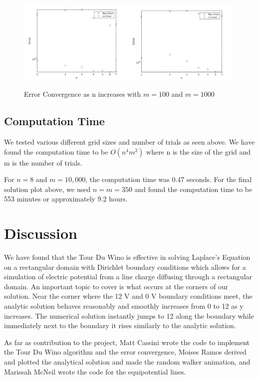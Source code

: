 \documentclass{amsart}
\begin{document}
\begin{figure}[H]
	\caption{Error Convergence as n increases with $m=100$ and $m=1000$}
	\label{gridsizeconv}
	\includegraphics[width=0.48\textwidth]{error_plot_m=100.jpg}
	\includegraphics[width=0.49\textwidth]{error_plot_m=1000.jpg}
\end{figure} 

\subsection{Computation Time}

We tested various different grid sizes and number of trials as seen above. We have found the computation time to be $O(n^4m^2)$ where n is the size of the grid and m is the number of trials.

For $n = 8$ and $m = 10,000$, the computation time was 0.47 seconds. For the final solution plot above, we used $n = m = 350$ and found the computation time to be 553 minutes or approximately 9.2 hours.

\section{Discussion}
We have found that the Tour Du Wino is effective in solving Laplace's Equation on a rectangular domain with Dirichlet boundary conditions which allows for a simulation of electric potential from a line charge diffusing through a rectangular domain. An important topic to cover is what occurs at the corners of our solution. Near the corner where the 12 V and 0 V boundary conditions meet, the analytic solution behaves reasonably and smoothly increases from 0 to 12 as y increases.
The numerical solution instantly jumps to 12 along the boundary while immediately next to the boundary it rises similarly to the analytic solution.


As far as contribution to the project, Matt Cassini wrote the code to implement the Tour Du Wino algorithm and the error convergence, Moises Ramos derived and plotted the analytical solution and made the random walker animation, and Marissah McNeil wrote the code for the equipotential lines.



\end{document}
